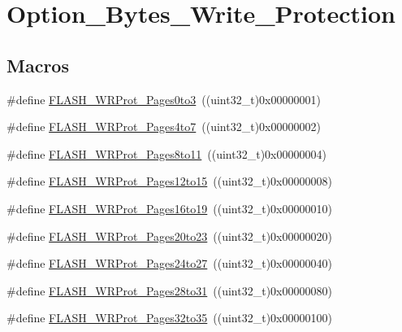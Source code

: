 \hypertarget{group___option___bytes___write___protection}{}\section{Option\+\_\+\+Bytes\+\_\+\+Write\+\_\+\+Protection}
\label{group___option___bytes___write___protection}
\subsection*{Macros}
\begin{DoxyCompactItemize}
\item 
\#define \mbox{\hyperlink{group___option___bytes___write___protection_gac5c6f6155e4ebae0978a3d2a0d991e68}{F\+L\+A\+S\+H\+\_\+\+W\+R\+Prot\+\_\+\+Pages0to3}}~((uint32\+\_\+t)0x00000001)
\item 
\#define \mbox{\hyperlink{group___option___bytes___write___protection_ga1b33c4de30c55331e7e60c0795c824ad}{F\+L\+A\+S\+H\+\_\+\+W\+R\+Prot\+\_\+\+Pages4to7}}~((uint32\+\_\+t)0x00000002)
\item 
\#define \mbox{\hyperlink{group___option___bytes___write___protection_ga7eca7a8b11accdd6dadf3445847e1a57}{F\+L\+A\+S\+H\+\_\+\+W\+R\+Prot\+\_\+\+Pages8to11}}~((uint32\+\_\+t)0x00000004)
\item 
\#define \mbox{\hyperlink{group___option___bytes___write___protection_gaa02b9439f75982e2e1c14f8af9a8c091}{F\+L\+A\+S\+H\+\_\+\+W\+R\+Prot\+\_\+\+Pages12to15}}~((uint32\+\_\+t)0x00000008)
\item 
\#define \mbox{\hyperlink{group___option___bytes___write___protection_gaa589ce30909c3a9a0bffc8a59b6013fb}{F\+L\+A\+S\+H\+\_\+\+W\+R\+Prot\+\_\+\+Pages16to19}}~((uint32\+\_\+t)0x00000010)
\item 
\#define \mbox{\hyperlink{group___option___bytes___write___protection_ga537e0f85899e13ca2ed93455e537d950}{F\+L\+A\+S\+H\+\_\+\+W\+R\+Prot\+\_\+\+Pages20to23}}~((uint32\+\_\+t)0x00000020)
\item 
\#define \mbox{\hyperlink{group___option___bytes___write___protection_ga1d6b94b48e0dd21949139267b90a08ef}{F\+L\+A\+S\+H\+\_\+\+W\+R\+Prot\+\_\+\+Pages24to27}}~((uint32\+\_\+t)0x00000040)
\item 
\#define \mbox{\hyperlink{group___option___bytes___write___protection_ga800860d071cfb40b1b0e94111a0cb549}{F\+L\+A\+S\+H\+\_\+\+W\+R\+Prot\+\_\+\+Pages28to31}}~((uint32\+\_\+t)0x00000080)
\item 
\#define \mbox{\hyperlink{group___option___bytes___write___protection_ga81a4250850e5fe7c251365cc22839a96}{F\+L\+A\+S\+H\+\_\+\+W\+R\+Prot\+\_\+\+Pages32to35}}~((uint32\+\_\+t)0x00000100)

\end{DoxyCompactItemize}
